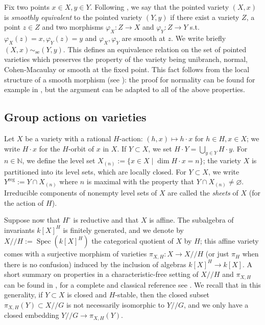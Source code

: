 \documentclass[12pt]{amsart}
\theoremstyle{definition}
\theoremstyle{remark}
\newcommand{\Nbb}{\mathbb{N}}
\newcommand{\reg}{{\operatorname{reg}}}
\newcommand{\Spec}{\operatorname{Spec}}
\newcommand{\se}{\operatorname{se}}
\begin{document}
Fix two points $x \in X, y \in Y$. Following \cite[\S 1.7]{Hess}, we say that the pointed variety $(X,x)$ is \emph{smoothly equivalent} to the pointed variety $(Y,y)$ if there exist a variety $Z$, a point $z \in Z$ and two morphisms
$\varphi_X \colon  Z \to X$ and $\varphi_Y \colon  Z \to Y$ s.t. $\varphi_X(z) = x, \varphi_Y(z) = y$ and $\varphi_X, \varphi_Y$ are  smooth at $z$.
We write briefly $(X,x) \sim_{\se} (Y,y)$.
This defines an equivalence relation on the set of pointed varieties which preserves the property of the variety being unibranch, normal, Cohen-Macaulay or smooth at the fixed point.
This fact follows from the local structure of a smooth morphism (see \cite[Proposition 3.24 (b)]{Milne}): the proof for normality can be found for example in \cite[Lemma 3.2]{XS}, but the argument can be adapted to all of the above properties.

\subsection{Group actions on varieties}
Let $X$ be a variety with a rational $H$-action:
$(h,x) \mapsto h \cdot x$ for $h \in H, x \in X$; we write $H \cdot x$ for the $H$-orbit of $x$ in $X$.
If $Y \subset X$, we set $H \cdot Y = \bigcup_{y \in Y} H \cdot y$.
For $n \in \Nbb$, we define the level set $X_{(n)} := \{ x \in X \mid \dim H \cdot x = n \}$;
the variety $X$ is partitioned into its level sets, which are locally closed. 
For $Y \subset X$, we write $Y^\reg := Y \cap X_{(n)}$ where $n$ is maximal with the property that $Y \cap X_{( n)} \neq \varnothing$.
Irreducible components of nonempty level sets of $X$ are called the \emph{sheets} of $X$ (for the action of $H$).

Suppose now that $H^\circ$ is reductive and that $X$ is affine.
The subalgebra of invariants $k[X]^H$ is finitely generated, and we denote by $X/\!/H := \Spec (k[X]^H)$ the categorical quotient of $X$ by $H$; this affine variety comes with a  surjective morphism of varieties $\pi_{X, H} \colon X \to X/\!/H$ (or just $\pi_H$ when there is no confusion) induced by the inclusion of algebras $k[X]^H \to k[X]$. 
A short summary on properties in a characteristic-free setting of $X/ \! /H$ and $\pi_{X,H}$ can be found in \cite[\S 2]{BR}, for a complete and classical reference see \cite{MumGit}.
We recall that in this generality, if $Y \subset X$ is closed and $H$-stable, then the closed subset $\pi_{X, H}(Y) \subset X/\!/ G$ is not necessarily isomorphic to $Y/\!/G$, and we only have a closed embedding $Y/\!/G \to \pi_{X, H}(Y)$.
\end{document}
